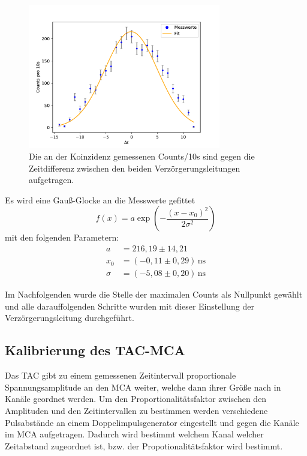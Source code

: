         \begin{figure}[h]
            \centering
            \includegraphics[width = 0.75\textwidth]{plots/Verzoergerung.pdf}
            \caption{Die an der Koinzidenz gemessenen Counts/10s sind gegen die Zeitdifferenz zwischen den beiden Verzörgerungsleitungen aufgetragen.}
            \label{fig:Verzoergerung}
        \end{figure}

        \FloatBarrier

        Es wird eine Gauß-Glocke an die Messwerte gefittet
        \begin{equation*}
            f(x) = a \exp\left(-\frac{\left(x - x_0\right)^2}{2 \sigma^2}\right)
        \end{equation*}
        mit den folgenden Parametern:
        \begin{align*}
            a &= 216,19 \pm 14,21 \\
            x_0 &= (-0,11 \pm 0,29) \, \text{ns} \\
            \sigma &= (-5,08 \pm 0,20) \, \text{ns}
        \end{align*}

        Im Nachfolgenden wurde die Stelle der maximalen Counts als Nullpunkt gewählt und alle darauffolgenden Schritte wurden mit dieser Einstellung der Verzörgerungsleitung durchgeführt.

    \subsection{Kalibrierung des TAC-MCA}
        Das TAC gibt zu einem gemessenen Zeitintervall proportionale Spannungsamplitude an den MCA weiter, welche dann ihrer Größe nach in Kanäle geordnet werden. Um den Proportionalitätsfaktor zwischen den Amplituden und den Zeitintervallen zu bestimmen werden verschiedene Pulsabstände an einem Doppelimpulsgenerator eingestellt und gegen die Kanäle im MCA aufgetragen. Dadurch wird bestimmt welchem Kanal welcher Zeitabstand zugeordnet ist, bzw. der Propotionalitätsfaktor wird bestimmt.

